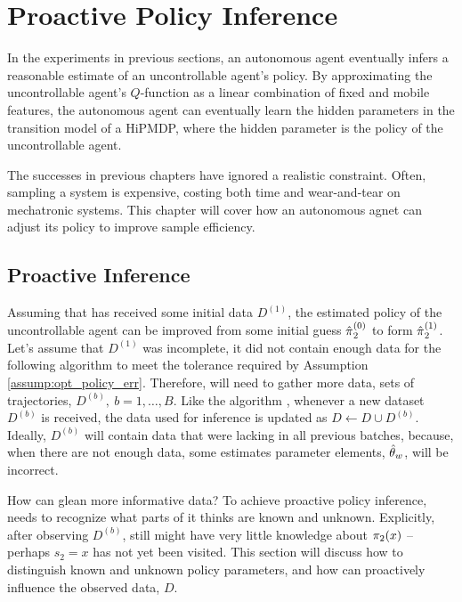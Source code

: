 \chapter{Proactive Policy Inference}\label{chapt:proactive_inference}

In the experiments in previous sections, an autonomous agent eventually infers a reasonable estimate of an uncontrollable agent's policy. By approximating the uncontrollable agent's $Q$-function as a linear combination of fixed and mobile features, the autonomous agent can eventually learn the hidden parameters in the transition model of a \ac{HiPMDP}, where the hidden parameter is the policy of the uncontrollable agent.

The successes in previous chapters have ignored a realistic constraint. Often, sampling a system is expensive, costing both time and wear-and-tear on mechatronic systems. This chapter will cover how an autonomous agnet can adjust its policy to improve sample efficiency.

\section{Proactive Inference}

Assuming that  has received some initial data $D^{(1)}$, the estimated policy of the uncontrollable agent
can be improved from some initial guess $\hat{\pi_{}}_2^{(0)}$ to form $\hat{\pi_{}}_2^{(1)}$. Let's
assume that $D^{(1)}$ was incomplete, it did not contain enough data for the following algorithm to meet the
tolerance required by Assumption \ref{assump:opt_policy_err}. Therefore,  will need to gather more data,
sets of trajectories, $D^{(b)},\ b=1,\ldots,B$. Like the \DAGGER algorithm \cite{ross2011reduction}, whenever a new dataset $D^{(b)}$ is received, the data used for inference is updated as $D\leftarrow D\cup D^{(b)}$. Ideally, $D^{(b)}$ will contain data that were lacking in all previous
batches, because, when there are not enough data, some estimates parameter elements, $\hat{\theta}_{w}$, will be
incorrect.

How can  glean more informative data? To achieve proactive policy inference,  needs to recognize
what parts of  it thinks are known and unknown. Explicitly, after observing $D^{(b)}$,  still
might have very little knowledge about $\pi_{2}(x)$ -- perhaps $s_2=x$ has not yet been visited. This section
will discuss how to distinguish known and unknown policy parameters, and how  can proactively influence the
observed data, $D$.

